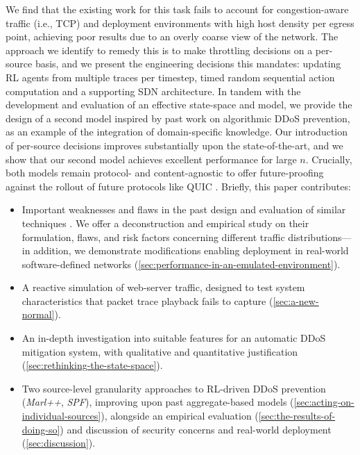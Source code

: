 \documentclass[conference, letterpaper, 10pt, times]{IEEEtran}
\begin{document}
We find that the existing work for this task fails to account for congestion-aware traffic (i.e., TCP) and deployment environments with high host density per egress point, achieving poor results due to an overly coarse view of the network.
The approach we identify to remedy this is to make throttling decisions on a per-source basis, and we present the engineering decisions this mandates: updating RL agents from multiple traces per timestep, timed random sequential action computation and a supporting SDN architecture.
In tandem with the development and evaluation of an effective state-space and model, we provide the design of a second model inspired by past work on algorithmic DDoS prevention, as an example of the integration of domain-specific knowledge.
Our introduction of per-source decisions improves substantially upon the state-of-the-art, and we show that our second model achieves excellent performance for large $n$.
Crucially, both models remain protocol- and content-agnostic to offer future-proofing against the rollout of future protocols like QUIC \cite{DBLP:conf/sigcomm/LangleyRWVKZYKS17}.
Briefly, this paper contributes:
\begin{itemize}
	\item Important weaknesses and flaws in the past design and evaluation of similar techniques \cite{DBLP:journals/eaai/MalialisK15}. We offer a deconstruction and empirical study on their formulation, flaws, and risk factors concerning different traffic distributions---in addition, we demonstrate modifications enabling deployment in real-world software-defined networks (\cref{sec:performance-in-an-emulated-environment}).
	\item A reactive simulation of web-server traffic, designed to test system characteristics that packet trace playback fails to capture (\cref{sec:a-new-normal}).
	\item An in-depth investigation into suitable features for an automatic DDoS mitigation system, with qualitative and quantitative justification (\cref{sec:rethinking-the-state-space}).
	\item Two source-level granularity approaches to RL-driven DDoS prevention (\emph{Marl++}, \emph{SPF}), improving upon past aggregate-based models (\cref{sec:acting-on-individual-sources}), alongside an empirical evaluation (\cref{sec:the-results-of-doing-so}) and discussion of security concerns and real-world deployment (\cref{sec:discussion}).
\end{itemize}
\end{document}
